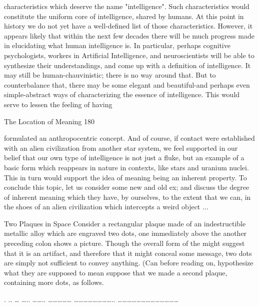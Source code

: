 characteristics which deserve the name "intelligence". Such characteristics would
constitute the uniform core of intelligence, shared by humans. At this point in history we
do not yet have a well-defined list of those characteristics. However, it appears likely that
within the next few decades there will be much progress made in elucidating what human
intelligence is. In particular, perhaps cognitive psychologists, workers in Artificial
Intelligence, and neuroscientists will be able to synthesize their understandings, and come
up with a definition of intelligence. It may still be human-chauvinistic; there is no way
around that. But to counterbalance that, there may be some elegant and beautiful-and
perhaps even simple-abstract ways of characterizing the essence of intelligence. This
would serve to lessen the feeling of having




The Location of Meaning                                                                  180

formulated an anthropocentric concept. And of course, if contact were established with an
alien civilization from another star system, we feel supported in our belief that our own
type of intelligence is not just a fluke, but an example of a basic form which reappears in
nature in contexts, like stars and uranium nuclei. This in turn would support the idea of
meaning being an inherent property.
        To conclude this topic, let us consider some new and old ex; and discuss the
degree of inherent meaning which they have, by ourselves, to the extent that we can, in
the shoes of an alien civilization which intercepts a weird object ...


                                Two Plaques in Space
Consider a rectangular plaque made of an indestructible metallic alloy which are
engraved two dots, one immediately above the another preceding colon shows a picture.
Though the overall form of the might suggest that it is an artifact, and therefore that it
might conceal some message, two dots are simply not sufficient to convey anything. (Can
before reading on, hypothesize what they are supposed to mean suppose that we made a
second plaque, containing more dots, as follows.

                                  .
                                 ..
                                …
                                …..
                               ……..
                              ……………
                            ……………………..
                          …………………………………


